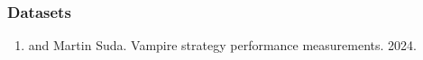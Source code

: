 
\subsubsection{Datasets}

\begin{enumerate}
\item {} and Martin Suda.
Vampire strategy performance measurements.
2024.
\cite{bartek10814478}
\end{enumerate}

%
